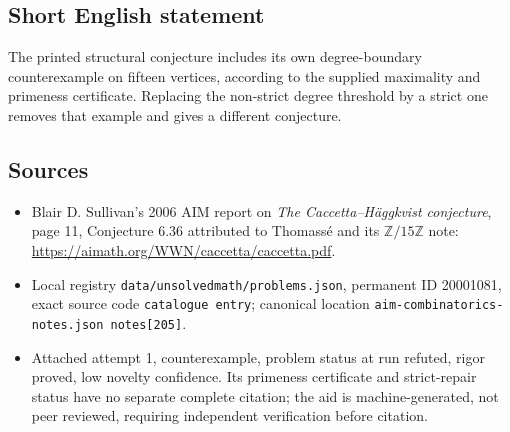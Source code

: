 \documentclass[11pt]{article}
\newcommand{\Z}{\mathbb{Z}}
\begin{document}
\subsection{Short English statement}
The printed structural conjecture includes its own degree-boundary counterexample on fifteen vertices, according to the supplied maximality and primeness certificate. Replacing the non-strict degree threshold by a strict one removes that example and gives a different conjecture.
\subsection{Sources}
\begin{itemize}
\item Blair D. Sullivan's 2006 AIM report on \emph{The Caccetta--H\"aggkvist conjecture}, page 11, Conjecture 6.36 attributed to Thomass\'e and its $\Z/15\Z$ note: \url{https://aimath.org/WWN/caccetta/caccetta.pdf}.
\item Local registry \texttt{data/unsolvedmath/problems.json}, permanent ID 20001081, exact source code \texttt{catalogue entry}; canonical location \texttt{aim-combinatorics-notes.json notes[205]}.
\item Attached attempt 1, counterexample, problem status at run refuted, rigor proved, low novelty confidence. Its primeness certificate and strict-repair status have no separate complete citation; the aid is machine-generated, not peer reviewed, requiring independent verification before citation.
\end{itemize}
\end{document}
